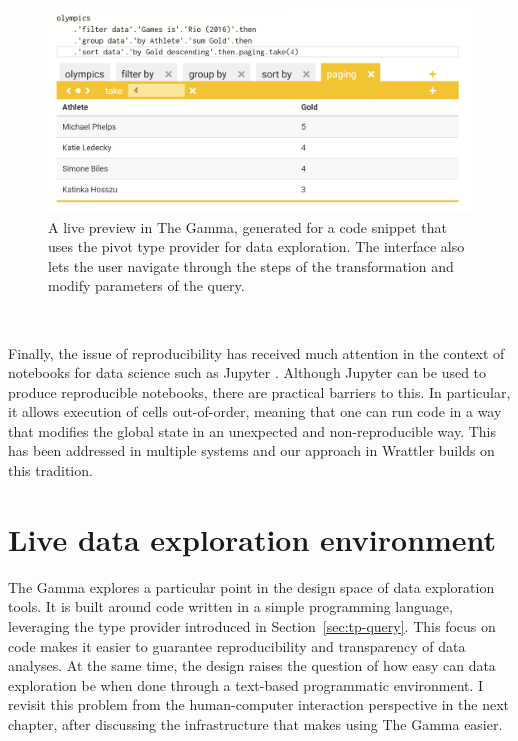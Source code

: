 \documentclass[fleqn,11pt]{report}
\theoremstyle{definition}
\begin{document}
\begin{figure}[t]
\includegraphics[scale=0.24]{img/live.png}
\caption{A live preview in The Gamma, generated for a code snippet that uses the pivot type
  provider for data exploration. The interface also lets the user navigate through the steps
  of the transformation and modify parameters of the query.}
\label{fig:live}
\end{figure}

~

Finally, the issue of reproducibility has received much attention in the context of notebooks
for data science such as Jupyter \citep{kluyver-2016-jupyter}. Although Jupyter can be used
to produce reproducible notebooks, there are practical barriers to this. In particular, it
allows execution of cells out-of-order, meaning that one can run code in a way that modifies
the global state in an unexpected and non-reproducible way. This has been addressed in multiple
systems \citep{pimentel-2015-noworkflow,koop-2017-dataflow} and our approach in Wrattler builds
on this tradition.

\section{Live data exploration environment}
\label{sec:infra-livedata}

The Gamma explores a particular point in the design space of data exploration
tools. It is built around code written in a simple programming language, leveraging the type
provider introduced in Section~\ref{sec:tp-query}. This focus on code makes it easier to guarantee
reproducibility and transparency of data analyses.  At the same time, the design raises the
question of how easy can data exploration be when done through a text-based programmatic
environment. I revisit this problem from the human-computer interaction perspective in the next
chapter, after discussing the infrastructure that makes using The Gamma easier.
\end{document}
